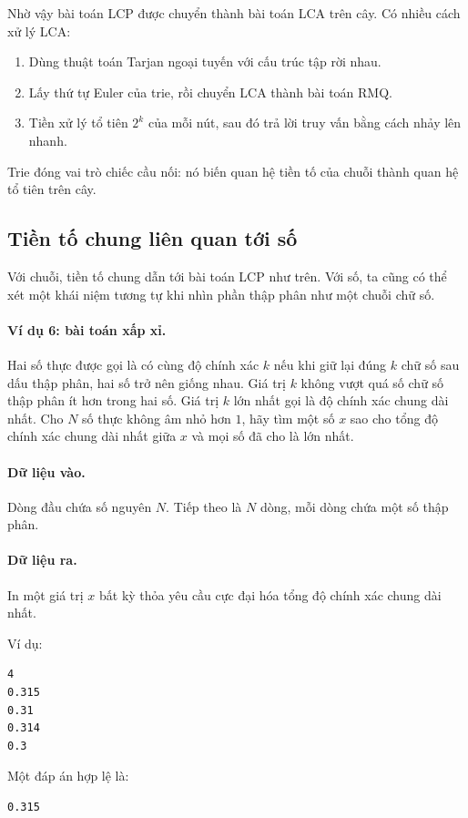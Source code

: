 \documentclass[11pt]{article}
\begin{document}
Nhờ vậy bài toán LCP được chuyển thành bài toán LCA trên cây. Có nhiều cách
xử lý LCA:
\begin{enumerate}
  \item Dùng thuật toán Tarjan ngoại tuyến với cấu trúc tập rời nhau.
  \item Lấy thứ tự Euler của trie, rồi chuyển LCA thành bài toán RMQ.
  \item Tiền xử lý tổ tiên \(2^k\) của mỗi nút, sau đó trả lời truy vấn bằng
  cách nhảy lên nhanh.
\end{enumerate}
Trie đóng vai trò chiếc cầu nối: nó biến quan hệ tiền tố của chuỗi thành quan
hệ tổ tiên trên cây.

\subsection{Tiền tố chung liên quan tới số}

Với chuỗi, tiền tố chung dẫn tới bài toán LCP như trên. Với số, ta cũng có
thể xét một khái niệm tương tự khi nhìn phần thập phân như một chuỗi chữ số.

\paragraph{Ví dụ 6: bài toán xấp xỉ.}
Hai số thực được gọi là có cùng độ chính xác \(k\) nếu khi giữ lại đúng \(k\)
chữ số sau dấu thập phân, hai số trở nên giống nhau. Giá trị \(k\) không vượt
quá số chữ số thập phân ít hơn trong hai số. Giá trị \(k\) lớn nhất gọi là độ
chính xác chung dài nhất. Cho \(N\) số thực không âm nhỏ hơn \(1\), hãy tìm
một số \(x\) sao cho tổng độ chính xác chung dài nhất giữa \(x\) và mọi số đã
cho là lớn nhất.

\paragraph{Dữ liệu vào.}
Dòng đầu chứa số nguyên \(N\). Tiếp theo là \(N\) dòng, mỗi dòng chứa một số
thập phân.

\paragraph{Dữ liệu ra.}
In một giá trị \(x\) bất kỳ thỏa yêu cầu cực đại hóa tổng độ chính xác chung
dài nhất.

Ví dụ:
\begin{verbatim}
4
0.315
0.31
0.314
0.3
\end{verbatim}
Một đáp án hợp lệ là:
\begin{verbatim}
0.315
\end{verbatim}
\end{document}
